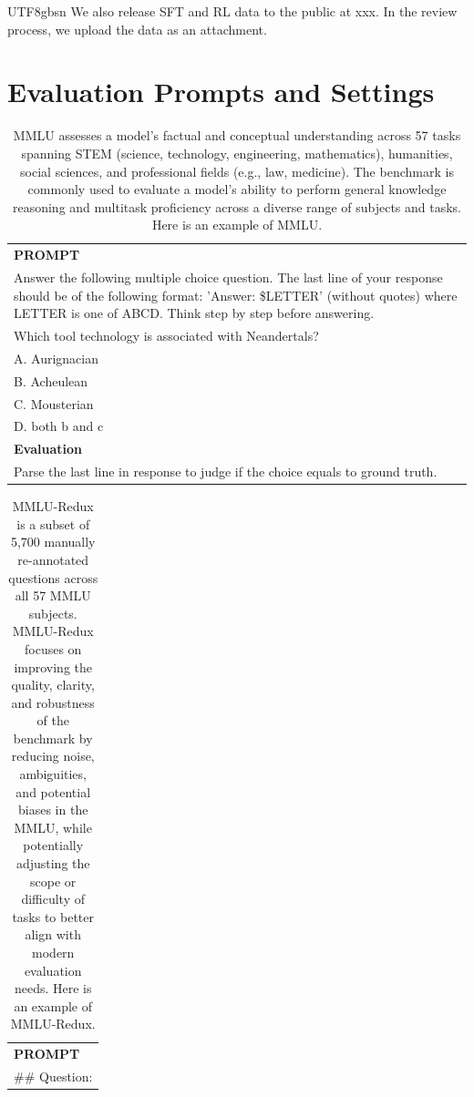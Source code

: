 \documentclass[11pt, a4paper, logo, copyright, nonumbering]{deepseek}
\begin{document}
\begin{CJK*}{UTF8}{gbsn}
We also release SFT and RL data to the public at xxx. In the review process, we upload the data as an attachment.

\section{Evaluation Prompts and Settings}
\begin{table}[h]
    \centering \small
        \caption{MMLU assesses a model's factual and conceptual understanding across 57 tasks spanning STEM (science, technology, engineering, mathematics), humanities, social sciences, and professional fields (e.g., law, medicine). The benchmark is commonly used to evaluate a model's ability to perform general knowledge reasoning and multitask proficiency across a diverse range of subjects and tasks. Here is an example of MMLU. }
    \label{tab:mmlu_eval_format_example}
    \begin{tabular}{p{}}
    \hline
    \textbf{PROMPT}\\
    Answer the following multiple choice question. The last line of your response should be of the following format: 'Answer: \$LETTER' (without quotes) where LETTER is one of ABCD. Think step by step before answering.\\[1ex] 
    Which tool technology is associated with Neandertals?\\[1ex]
    A. Aurignacian\\
    B. Acheulean\\
    C. Mousterian\\
    D. both b and c \\ \hline
      \textbf{Evaluation}\\
      Parse the last line in response to judge if the  choice equals to ground truth. \\ \hline
    \end{tabular}
\end{table}

\begin{table}[h]
    \centering \small
        \caption{MMLU-Redux is a subset of 5,700 manually re-annotated questions across all 57 MMLU subjects. MMLU-Redux focuses on improving the quality, clarity, and robustness of the benchmark by reducing noise, ambiguities, and potential biases in the MMLU, while potentially adjusting the scope or difficulty of tasks to better align with modern evaluation needs. Here is an example of MMLU-Redux.}
    \label{tab:mmluredux_eval_format_example}
    \begin{tabular}{p{}}
    \hline
    \textbf{PROMPT}\\
    \#\# Question: 


\end{tabular}
\end{table}
\end{CJK*}
\end{document}
